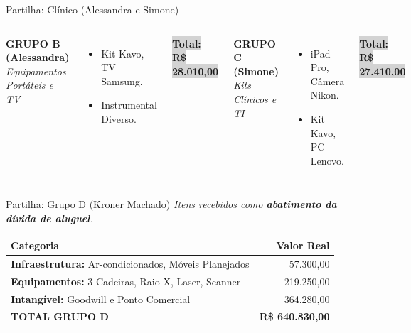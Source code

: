 \documentclass[10pt, aspectratio=169, squeeze]{beamer}
\newcommand{\reais}[1]{R\$ #1}
\begin{document}
\begin{frame}{Partilha: Clínico (Alessandra e Simone)}
    \begin{columns}
            \textbf{GRUPO B (Alessandra)} \\
            \textit{Equipamentos Portáteis e TV}
            \vspace{0.2cm}
            \begin{itemize}
                \item Kit Kavo, TV Samsung.
                \item Instrumental Diverso.
            \end{itemize}
            \vspace{0.2cm}
            \colorbox{lightGray}{\textbf{Total: \reais{28.010,00}}}

            \textbf{GRUPO C (Simone)} \\
            \textit{Kits Clínicos e TI}
            \vspace{0.2cm}
            \begin{itemize}
                \item iPad Pro, Câmera Nikon.
                \item Kit Kavo, PC Lenovo.
            \end{itemize}
            \vspace{0.2cm}
            \colorbox{lightGray}{\textbf{Total: \reais{27.410,00}}}
    \end{columns}
\end{frame}

\begin{frame}{Partilha: Grupo D (Kroner Machado)}
    \textit{Itens recebidos como \textbf{abatimento da dívida de aluguel}.}
    
    \begin{table}
        \centering
        \small
        \begin{tabularx}{\textwidth}{X r}
            \toprule
            \textbf{Categoria} & \textbf{Valor Real} \\
            \midrule
            \textbf{Infraestrutura:} Ar-condicionados, Móveis Planejados & 57.300,00 \\
            \textbf{Equipamentos:} 3 Cadeiras, Raio-X, Laser, Scanner & 219.250,00 \\
            \textbf{Intangível:} Goodwill e Ponto Comercial & 364.280,00 \\
            \midrule
            \rowcolor{primaryColor!10} \textbf{TOTAL GRUPO D} & \textbf{\reais{640.830,00}} \\
            \bottomrule
        \end{tabularx}
    \end{table}
\end{frame}
\end{document}

